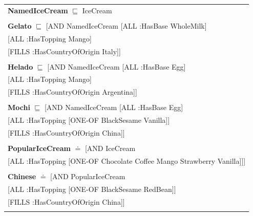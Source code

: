\documentclass[12pt]{article}
\newcommand*{\MyIndent}{\hspace*{7em}}
\begin{document}
\begin{tabularx}{1\textwidth}{@{}X@{}}
            \textbf{NamedIceCream} $\sqsubseteq$ IceCream \\ \tabularnewline
            
            \textbf{Gelato} $\sqsubseteq$ [AND NamedIceCream [ALL :HasBase WholeMilk] \\
                                                   \MyIndent [ALL :HasTopping Mango] \\
                                                   \MyIndent [FILLS :HasCountryOfOrigin Italy]] \\
                                                   \tabularnewline
            
            \textbf{Helado} $\sqsubseteq$ [AND NamedIceCream [ALL :HasBase Egg] \\
                                                   \MyIndent [ALL :HasTopping Mango] \\
                                                   \MyIndent [FILLS :HasCountryOfOrigin Argentina]] \\
                                                   \tabularnewline

            \textbf{Mochi} $\sqsubseteq$ [AND NamedIceCream [ALL :HasBase Egg] \\
                                                  \MyIndent [ALL :HasTopping [ONE-OF BlackSesame Vanilla]] \\
                                                  \MyIndent [FILLS :HasCountryOfOrigin China]] \\
                                                  \tabularnewline

            \textbf{PopularIceCream} $\doteq$ [AND IceCream \\
                                                  \MyIndent [ALL :HasTopping [ONE-OF Chocolate Coffee Mango Strawberry Vanilla]]] \\
                                                  \tabularnewline

            \textbf{Chinese} $\doteq$ [AND PopularIceCream \\
                                                  \MyIndent [ALL :HasTopping [ONE-OF BlackSesame RedBean]] \\
                                                  \MyIndent [FILLS :HasCountryOfOrigin China]] \\
                                                  \tabularnewline


\end{tabularx}
\end{document}
